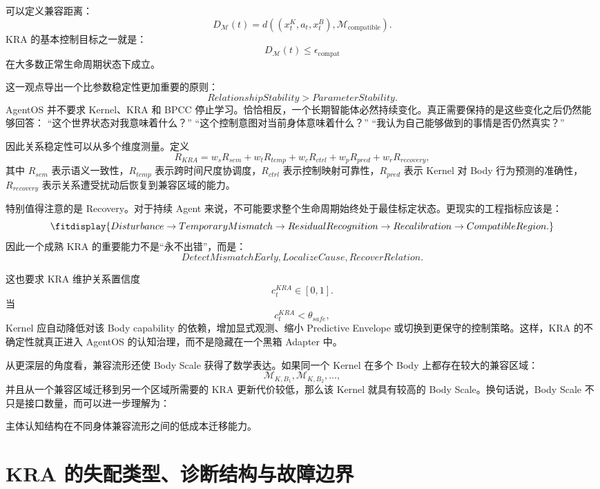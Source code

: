 可以定义兼容距离：
\[
D_{\mathcal M}(t)
=
d
\left(
(x^K_t,a_t,x^B_t),
\mathcal M_{\mathrm{compatible}}
\right).
\]
KRA 的基本控制目标之一就是：
\[
\boxed{
D_{\mathcal M}(t)
\leq
\epsilon_{\mathrm{compat}}
}
\]
在大多数正常生命周期状态下成立。

这一观点导出一个比参数稳定性更加重要的原则：
\[
\boxed{
RelationshipStability
>
ParameterStability.
}
\]
AgentOS 并不要求 Kernel、KRA 和 BPCC 停止学习。恰恰相反，一个长期智能体必然持续变化。真正需要保持的是这些变化之后仍然能够回答：
``这个世界状态对我意味着什么？''
``这个控制意图对当前身体意味着什么？''
``我认为自己能够做到的事情是否仍然真实？''

因此关系稳定性可以从多个维度测量。定义
\[
R_{KRA}
=
w_sR_{sem}
+
w_tR_{temp}
+
w_cR_{ctrl}
+
w_pR_{pred}
+
w_rR_{recovery},
\]
其中 $R_{sem}$ 表示语义一致性，$R_{temp}$ 表示跨时间尺度协调度，$R_{ctrl}$ 表示控制映射可靠性，$R_{pred}$ 表示 Kernel 对 Body 行为预测的准确性，$R_{recovery}$ 表示关系遭受扰动后恢复到兼容区域的能力。

特别值得注意的是 Recovery。对于持续 Agent 来说，不可能要求整个生命周期始终处于最佳标定状态。更现实的工程指标应该是：
\[
\fitdisplay{
Disturbance
\rightarrow
TemporaryMismatch
\rightarrow
ResidualRecognition
\rightarrow
Recalibration
\rightarrow
CompatibleRegion.
}
\]
因此一个成熟 KRA 的重要能力不是``永不出错''，而是：
\[
\boxed{
DetectMismatchEarly,
LocalizeCause,
RecoverRelation.
}
\]

这也要求 KRA 维护关系置信度
\[
c_t^{KRA}
\in[0,1].
\]
当
\[
c_t^{KRA}<\theta_{safe},
\]
Kernel 应自动降低对该 Body capability 的依赖，增加显式观测、缩小 Predictive Envelope 或切换到更保守的控制策略。这样，KRA 的不确定性就真正进入 AgentOS 的认知治理，而不是隐藏在一个黑箱 Adapter 中。

从更深层的角度看，兼容流形还使 Body Scale 获得了数学表达。如果同一个 Kernel 在多个 Body 上都存在较大的兼容区域：
\[
\mathcal M_{K,B_1},
\mathcal M_{K,B_2},
\dots ,
\]
并且从一个兼容区域迁移到另一个区域所需要的 KRA 更新代价较低，那么该 Kernel 就具有较高的 Body Scale。换句话说，Body Scale 不只是接口数量，而可以进一步理解为：
\begin{statementbox}
主体认知结构在不同身体兼容流形之间的低成本迁移能力。
\end{statementbox}

\section{KRA 的失配类型、诊断结构与故障边界}
\label{sec:kra-failure-diagnostics}


